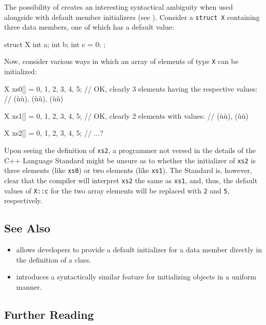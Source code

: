 \noindent The possibility of  creates an interesting
syntactical ambiguity when used alongside  with
default member initializers (see ). Consider a
\lstinline!struct!~\lstinline!X! containing three data members, one of which
has a default value:

\newpage%
\begin{emcppslisting}[emcppsbatch=e5]
struct X
{
    int a;
    int b;
    int c = 0;
};
\end{emcppslisting}

\noindent Now, consider various ways in which an array of elements of type
\lstinline!X! can be initialized:

\begin{emcppslisting}[emcppsbatch=e5,emcppsstandards={c++14},emcppserrorlines={9}]
X xs0[] = {{0, 1}, {2, 3}, {4, 5}};
    // OK, clearly 3 elements having the respective values:
    // (ù{}ù), (ù{}ù), (ù{}ù)

X xs1[] = {{0, 1, 2}, {3, 4, 5}};
    // OK, clearly 2 elements with values:
    // (ù{}ù), (ù{}ù)

X xs2[] = {0, 1, 2, 3, 4, 5};
    // ...?
\end{emcppslisting}

\noindent Upon seeing the definition of \lstinline!xs2!, a programmer not versed in
the details of the C++ Language Standard might be unsure as to whether the
initializer of \lstinline!xs2! is three elements (like \lstinline!xs0!) or two
elements (like \lstinline!xs1!). The Standard is, however, clear that the
compiler will interpret \lstinline!xs2! the same as \lstinline!xs1!, and,
thus, the default values of \lstinline!X::c! for the two array elements
will be replaced with \lstinline!2! and \lstinline!5!, respectively.

\subsection[See Also]{See Also}\label{see-also}

\begin{itemize}
\item{allows developers to provide a default initializer for a data member directly in the definition of a class.}
\item{introduces a syntactically similar feature for initializing objects in a uniform manner.}
\end{itemize}

\subsection[Further Reading]{Further Reading}\label{further-reading}



